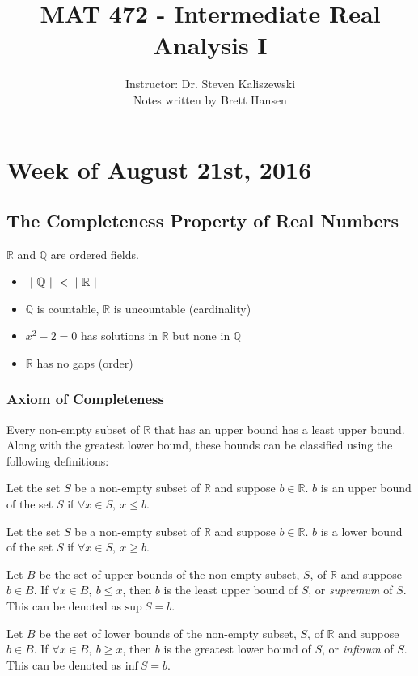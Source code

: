 \documentclass{article}
\title{MAT 472 - Intermediate Real Analysis I}
\author{
{\Large Instructor: Dr. Steven Kaliszewski} \\
		Notes written by Brett Hansen
}
\date{}
\begin{document}
\maketitle
\tableofcontents
\break

\section{Week of August 21st, 2016}
\subsection{The Completeness Property of Real Numbers}
$\mathbb{R}$ and $\mathbb{Q}$ are ordered fields.
\begin{itemize}
\item $\ |\ \mathbb{Q}\ |\  < \ |\ \mathbb{R}\ |\ $
\item $\mathbb{Q}$ is countable, $\mathbb{R}$ is uncountable (cardinality)
\item $x^2-2=0$ has solutions in $\mathbb{R}$ but none in $\mathbb{Q}$
\item $\mathbb{R}$ has no gaps (order)
\end{itemize}

\subsubsection{Axiom of Completeness}
Every non-empty subset of $\mathbb{R}$ that has an upper bound has a least upper bound. Along with the greatest lower bound, these bounds can be classified using the following definitions: \\

\begin{defn}Let the set $S$ be a non-empty subset of $\mathbb{R}$ and suppose $b\in\mathbb{R}$. $b$ is an upper bound of the set $S$ if $\forall x\in S,\ x \leq b$.
\end{defn}
\begin{defn}Let the set $S$ be a non-empty subset of $\mathbb{R}$ and suppose $b\in\mathbb{R}$. $b$ is a lower bound of the set $S$ if $\forall x\in S,\ x \geq b$.
\end{defn}
\begin{defn}[Supremum]Let $B$ be the set of upper bounds of the non-empty subset, $S$, of $\mathbb{R}$ and suppose $b\in B$. If $\forall x\in B,\ b \leq x$, then $b$ is the least upper bound of $S$, or \textit{supremum} of $S$. This can be denoted as $\text{sup}\ S=b$.
\end{defn}
\begin{defn}[Infinum]Let $B$ be the set of lower bounds of the non-empty subset, $S$, of $\mathbb{R}$ and suppose $b\in B$. If $\forall x\in B,\ b \geq x$, then $b$ is the greatest lower bound of $S$, or \textit{infinum} of $S$. This can be denoted as $\text{inf}\ S=b$.
\end{defn}
\example{$A=[0,\ 2]\quad\longrightarrow\quad\text{sup}\ A=2$ \\
		   $A=[0,\ 2)\quad\longrightarrow\quad\text{sup}\ A=2$}
\end{document}
